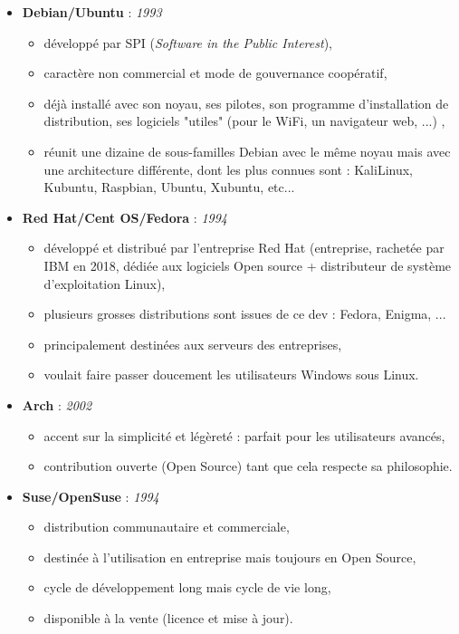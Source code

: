 \begin{itemize}
\item \textbf{Debian/Ubuntu} : \textit{1993}
    \begin{itemize}
    \item développé par SPI (\textit{Software in the Public Interest}),
	\item caractère non commercial et mode de gouvernance coopératif,
	\item déjà installé avec son noyau, ses pilotes, son programme d'installation
   de distribution, ses logiciels "utiles" (pour le WiFi, un navigateur web, ...) ,
	\item réunit une dizaine de sous-familles Debian avec le même noyau mais avec une
   architecture différente, dont les plus connues sont : KaliLinux, Kubuntu, Raspbian,
    Ubuntu, Xubuntu, etc...\newline
    \end{itemize}

\item \textbf{Red Hat/Cent OS/Fedora} : \textit{1994}
    \begin{itemize}
	\item développé et distribué par l'entreprise Red Hat (entreprise, rachetée
  par IBM en 2018, dédiée aux logiciels Open source +
   distributeur de système d'exploitation Linux),
	\item plusieurs grosses distributions sont issues de ce dev : Fedora, Enigma, ...
	\item principalement destinées aux serveurs des entreprises,
	\item voulait faire passer doucement les utilisateurs Windows sous Linux.\newline
	\end{itemize}

\item \textbf{Arch} : \textit{2002}
    \begin{itemize}
	\item accent sur la simplicité et légèreté : parfait pour les utilisateurs avancés,
	\item contribution ouverte (Open Source) tant que cela respecte sa
  philosophie.\newline
	\end{itemize}

\item \textbf{Suse/OpenSuse} : \textit{1994}
    \begin{itemize}
	\item distribution communautaire et commerciale,
	\item destinée à l'utilisation en entreprise mais toujours en Open Source,
	\item cycle de développement long mais cycle de vie long,
	\item disponible à la vente (licence et mise à jour).
	\end{itemize}
\end{itemize}
